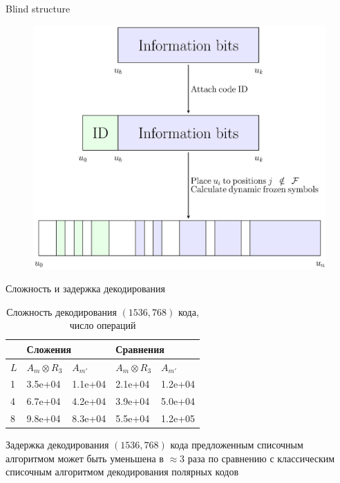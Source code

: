 \begin{frame}{Blind structure}
  \begin{figure}
    \centering
    \includegraphics[width=0.7\linewidth]{pictures/BlindStructure.eps}
  \end{figure}
\end{frame}

\begin{frame}{Сложность и задержка декодирования}
  \begin{table}
    \caption{Сложность декодирования $(1536, 768)$ кода, число операций}
    \begin{tabular}[c]{|l|ll|ll|}
      \hline
      & \multicolumn{2}{l|}{Сложения} & \multicolumn{2}{l|}{Сравнения}\\
      \hline
      $L$ & $A_m \otimes R_3$ & $A_{m'}$ & $A_m \otimes R_3$ & $A_{m'}$\\
      \hline
      1 & 3.5e+04 & 1.1e+04 & 2.1e+04 & 1.2e+04\\
      4 & 6.7e+04 & 4.2e+04 & 3.9e+04 & 5.0e+04\\
      8 & 9.8e+04 & 8.3e+04 & 5.5e+04 & 1.2e+05\\
      \hline
    \end{tabular}
  \end{table}

  Задержка декодирования $(1536, 768)$ кода предложенным списочным алгоритмом может быть уменьшена в $\approx 3$ раза по сравнению с классическим списочным алгоритмом декодирования полярных кодов
\end{frame}

